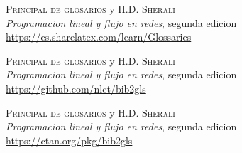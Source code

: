 \documentclass[letterpaper,12pt]{article}
\begin{document}
\begin{thebibliography}{X}
	 \textsc{Principal de glosarios} y \textsc{H.D. Sherali}\\
	\textit{Programacion lineal y flujo en redes}, segunda edicion\\
	\url{https://es.sharelatex.com/learn/Glossaries}

	 \textsc{Principal de glosarios} y \textsc{H.D. Sherali}\\
	\textit{Programacion lineal y flujo en redes}, segunda edicion\\
	\url{https://github.com/nlct/bib2gls}

	 \textsc{Principal de glosarios} y \textsc{H.D. Sherali}\\
	\textit{Programacion lineal y flujo en redes}, segunda edicion\\
	\url{https://ctan.org/pkg/bib2gls}

\end{thebibliography}
\end{document}
